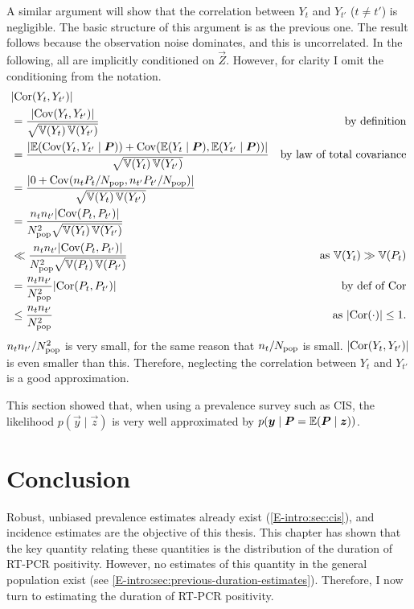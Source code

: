 \documentclass[thesis.tex]{subfiles}
\begin{document}
A similar argument will show that the correlation between $Y_t$ and $Y_{t'}$ ($t \neq t'$) is negligible.
The basic structure of this argument is as the previous one.
The result follows because the observation noise dominates, and this is uncorrelated.
In the following, all are implicitly conditioned on $\vec{Z}$.
However, for clarity I omit the conditioning from the notation.
\begin{align}
  &\lvert \operatorname{Cor}(Y_t, Y_{t'}) \rvert \\
  &= \frac{\lvert\operatorname{Cov}(Y_t, Y_{t'})\rvert}{\sqrt{\operatorname{\mathbb{V}}(Y_t) \operatorname{\mathbb{V}}(Y_{t'})}} &\text{by definition}\\
  &= \frac{\lvert \operatorname{\mathbb{E}}(\operatorname{Cov}(Y_t, Y_{t'} \mid \bm{P})) + \operatorname{Cov}(\operatorname{\mathbb{E}}(Y_t \mid \bm{P}), \operatorname{\mathbb{E}}(Y_{t'} \mid \bm{P})) \rvert}{\sqrt{\operatorname{\mathbb{V}}(Y_t) \operatorname{\mathbb{V}}(Y_{t'})}} &\text{by law of total covariance} \\
  &= \frac{\lvert 0 + \operatorname{Cov}(n_t P_t / N_\text{pop}, n_{t'} P_{t'} / N_\text{pop}) \rvert}{\sqrt{\operatorname{\mathbb{V}}(Y_t) \operatorname{\mathbb{V}}(Y_{t'})}} \\
  &= \frac{n_t n_{t'} \lvert \operatorname{Cov}(P_t, P_{t'}) \rvert}{N_\text{pop}^2 \sqrt{\operatorname{\mathbb{V}}(Y_t) \operatorname{\mathbb{V}}(Y_{t'})}}  \\
  &\ll \frac{n_t n_{t'} \lvert \operatorname{Cov}(P_t, P_{t'}) \rvert}{N_\text{pop}^2 \sqrt{\operatorname{\mathbb{V}}(P_t) \operatorname{\mathbb{V}}(P_{t'})}} &\text{as $\operatorname{\mathbb{V}}(Y_t) \gg \operatorname{\mathbb{V}}(P_t)$} \\
  &= \frac{n_t n_{t'}}{N_\text{pop}^2} \lvert \operatorname{Cor}(P_t, P_{t'}) \rvert &\text{by def of $\operatorname{Cor}$}\\
  &\leq \frac{n_t n_{t'}}{N_\text{pop}^2} &\text{as $\lvert \operatorname{Cor}(\cdot) \rvert \leq 1$}.
\end{align}
$n_t n_{t'} / N_\text{pop}^2$ is very small, for the same reason that $n_t / N_\text{pop}$ is small.
$\lvert \operatorname{Cor}(Y_t, Y_{t'}) \rvert$ is even smaller than this.
Therefore, neglecting the correlation between $Y_t$ and $Y_{t'}$ is a good approximation.

This section showed that, when using a prevalence survey such as CIS, the likelihood $p(\vec{y} \mid \vec{z})$ is very well approximated by $p(\bm{y} \mid \bm{P} = \operatorname{\mathbb{E}}(\bm{P} \mid \bm{z}))$.


\section{Conclusion} \label{inc-prev:sec:conclusion}

Robust, unbiased prevalence estimates already exist (\cref{E-intro:sec:cis}), and incidence estimates are the objective of this thesis.
This chapter has shown that the key quantity relating these quantities is the distribution of the duration of RT-PCR positivity.
However, no estimates of this quantity in the general population exist (see \cref{E-intro:sec:previous-duration-estimates}).
Therefore, I now turn to estimating the duration of RT-PCR positivity.

\ifSubfilesClassLoaded{
  \listoftodos
}{}
\end{document}
